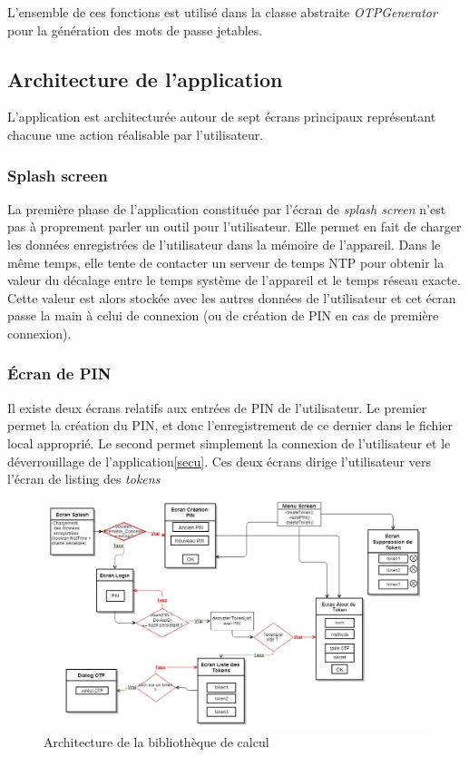 L'ensemble de ces fonctions est utilisé dans la classe abstraite \emph{OTPGenerator} pour la
génération des mots de passe jetables.

\subsection{Architecture de l'application}

L'application est architecturée autour de sept écrans principaux représentant chacune une
action réalisable par l'utilisateur.

\subsubsection{Splash screen}
La première phase de l'application constituée par l'écran de \emph{splash screen} n'est pas à proprement parler un outil pour l'utilisateur. Elle permet
en fait de charger les données enregistrées de l'utilisateur dans la mémoire de l'appareil. Dans le même temps, elle tente de contacter un serveur de temps NTP pour obtenir la valeur
du décalage entre le temps système de l'appareil et le temps réseau exacte. Cette valeur est
alors stockée avec les autres données de l'utilisateur et cet écran passe la main à celui
de connexion (ou de création de PIN en cas de première connexion).

\subsubsection{Écran de PIN}
Il existe deux écrans relatifs aux entrées de PIN de l'utilisateur. Le premier permet la création
du PIN, et donc l'enregistrement de ce dernier dans le fichier local approprié. Le second permet
simplement la connexion de l'utilisateur et le déverrouillage de l'application\ref{secu}. Ces deux
écrans dirige l'utilisateur vers l'écran de listing des \emph{tokens}


\begin{figure}
  \centering
  \includegraphics[scale=0.4]{../graphics/archi-android.jpg}
  \caption{Architecture de la bibliothèque de calcul}
  \label{fig:umlLib}
\end{figure}

